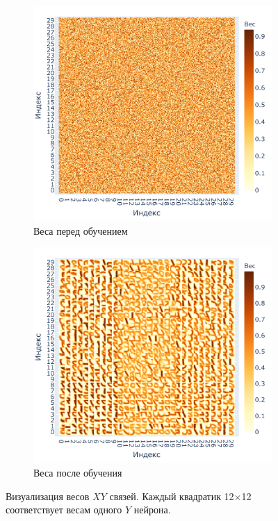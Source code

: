 \documentclass[a4paper]{article}
\begin{document}
\begin{figure}[H]
\centering
\begin{subfigure}{0.45\textwidth}
    \includegraphics[width=\textwidth,keepaspectratio=true]{weights_XY_untrained_ru.pdf}
    \caption{Веса перед обучением}
\end{subfigure}
\begin{subfigure}{0.45\textwidth}  \label{weights_XY}
    \includegraphics[width=\textwidth,keepaspectratio=true]{weights_XY_ru.pdf}
    \caption{Веса после обучения}
\end{subfigure}
\caption{Визуализация весов $XY$ связей. Каждый квадратик 12$\times$12 соответствует весам одного $Y$ нейрона.}
\end{figure}
\end{document}
